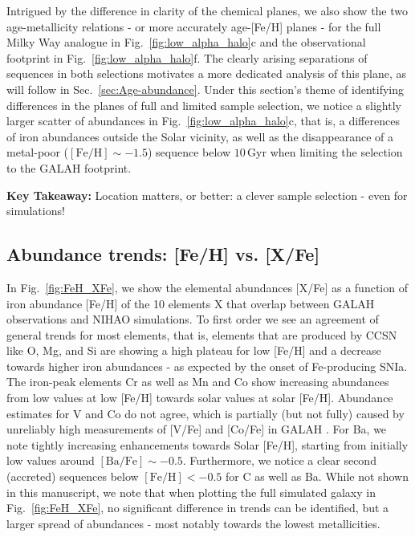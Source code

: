 \documentclass[fleqn,usenatbib]{mnras}
\begin{document}
Intrigued by the difference in clarity of the chemical planes, we also show the two age-metallicity relations - or more accurately age-[Fe/H] planes - for the full Milky Way analogue in Fig.~\ref{fig:low_alpha_halo}c and the observational footprint in Fig.~\ref{fig:low_alpha_halo}f. The clearly arising separations of sequences in both selections motivates a more dedicated analysis of this plane, as will follow in Sec.~\ref{sec:Age-abundance}. Under this section's theme of identifying differences in the planes of full and limited sample selection, we notice a slightly larger scatter of abundances in Fig.~\ref{fig:low_alpha_halo}c, that is, a differences of iron abundances outside the Solar vicinity, as well as the disappearance of a metal-poor ($\mathrm{[Fe/H]} \sim -1.5$) sequence below $10\,\mathrm{Gyr}$ when limiting the selection to the GALAH footprint.

\textbf{Key Takeaway:} Location matters, or better: a clever sample selection - even for simulations!

\subsection{Abundance trends: [Fe/H] vs. [X/Fe]} \label{sec:feh_xfe}

In Fig.~\ref{fig:FeH_XFe}, we show the elemental abundances [X/Fe] as a function of iron abundance [Fe/H] of the 10 elements X that overlap between GALAH observations and NIHAO simulations. To first order we see an agreement of general trends for most elements, that is, elements that are produced by CCSN like O, Mg, and Si are showing a high plateau for low [Fe/H] and a decrease towards higher iron abundances - as expected by the onset of Fe-producing SNIa. The iron-peak elements Cr as well as Mn and Co show increasing abundances from low values at low [Fe/H] towards solar values at solar [Fe/H]. Abundance estimates for V and Co do not agree, which is partially (but not fully) caused by unreliably high measurements of [V/Fe] and [Co/Fe] in GALAH \citet{Buder2021}. For Ba, we note tightly increasing enhancements towards Solar [Fe/H], starting from initially low values around $\mathrm{[Ba/Fe]} \sim -0.5$. Furthermore, we notice a clear second (accreted) sequences below $\mathrm{[Fe/H]} < -0.5$ for C as well as Ba. While not shown in this manuscript, we note that when plotting the full simulated galaxy in Fig.~\ref{fig:FeH_XFe}, no significant difference in trends can be identified, but a larger spread of abundances - most notably towards the lowest metallicities.
\end{document}
